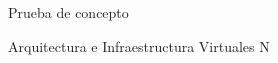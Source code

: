 \begin{section}{Prueba de concepto}
\begin{subsection}{Arquitectura e Infraestructura Virtuales\cite{CFVirtInfraes}}
N


\end{subsection}
\end{section}
